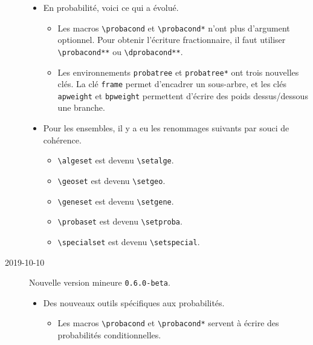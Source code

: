 \documentclass[12pt,a4paper]{article}
\newcommand\env[1]{\texttt{#1}}
\newcommand\macro[1]{\env{\textbackslash{}#1}}
\theoremstyle{definition}
\begin{document}
\begin{description}
\begin{itemize}[itemsep=.5em]
    
    
    
        \item En probabilité, voici ce qui a évolué.
        \begin{itemize}[itemsep=.5em]
            \item Les macros \macro{probacond} et \macro{probacond*} n'ont plus d'argument optionnel. Pour obtenir l'écriture fractionnaire, il faut utiliser \macro{probacond**} ou \macro{dprobacond**}.
    
            \item Les environnements \verb+probatree+ et \verb+probatree*+ ont trois nouvelles clés.
                  La clé \verb+frame+ permet d'encadrer un sous-arbre, et les clés \verb+apweight+ et \verb+bpweight+ permettent d'écrire des poids dessus/dessous une branche.
        \end{itemize}
    
    
    
    
        \item Pour les ensembles, il y a eu les renommages suivants par souci de cohérence.
        \begin{itemize}[itemsep=.5em]
            \item \macro{algeset} est devenu \macro{setalge}.
    
            \item \macro{geoset} est devenu \macro{setgeo}.
    
            \item \macro{geneset} est devenu \macro{setgene}.
    
            \item \macro{probaset} est devenu \macro{setproba}.
    
            \item \macro{specialset} est devenu \macro{setspecial}.
        \end{itemize}
    \end{itemize}


    \medskip
    \item[2019-10-10] Nouvelle version mineure \verb+0.6.0-beta+.
    
    \begin{itemize}[itemsep=.5em]
        \item Des nouveaux outils spécifiques aux probabilités.
        \begin{itemize}[itemsep=.5em]
            \item Les macros \macro{probacond} et \macro{probacond*} servent à écrire des probabilités conditionnelles.
    

\end{itemize}
\end{itemize}
\end{description}
\end{document}
